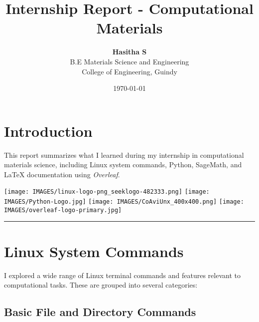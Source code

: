 \documentclass[a4paper,12pt=]{article}
\title {\textbf{Internship Report - Computational Materials}}
\author{\textbf{Hasitha S}\\
\small{B.E Materials Science and Engineering}\\
\small{College of Engineering, Guindy}}
\date{\today}
\begin{document}
\maketitle

\section{Introduction}

This report summarizes what I learned during my internship in computational materials science, including Linux system commands, Python, SageMath, and LaTeX documentation using \textit{Overleaf}.

\begin{center}
 \texttt{[image: IMAGES/linux-logo-png\_seeklogo-482333.png]} \hspace{0.5cm}
\texttt{[image: IMAGES/Python-Logo.jpg]} \hspace{0.5cm}
\texttt{[image: IMAGES/CoAviUnx\_400x400.png]} \hspace{0.5cm}
\texttt{[image: IMAGES/overleaf-logo-primary.jpg]} \hspace{0.5cm}
\end{center}

\rule{\linewidth}{0.1pt}


\section{Linux System Commands}

 I explored a wide range of Linux terminal commands and features relevant to computational tasks. These are grouped into several categories:
\subsection{Basic File and Directory Commands}
\end{document}
